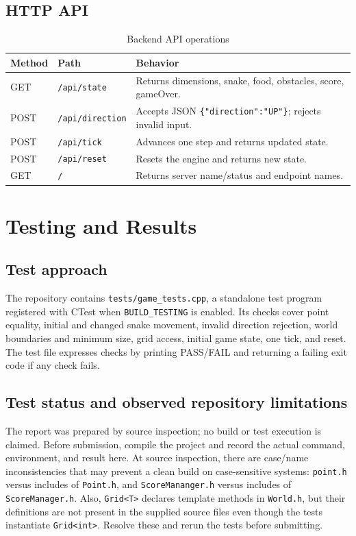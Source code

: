 \documentclass[12pt,a4paper]{report}
\begin{document}
\section{HTTP API}
\begin{table}[H]
\centering
\caption{Backend API operations}
\begin{tabular}{p{27mm}p{34mm}p{72mm}}
\toprule
Method & Path & Behavior\\\midrule
GET & \texttt{/api/state} & Returns dimensions, snake, food, obstacles, score, gameOver.\\
POST & \texttt{/api/direction} & Accepts JSON \texttt{\{"direction":"UP"\}}; rejects invalid input.\\
POST & \texttt{/api/tick} & Advances one step and returns updated state.\\
POST & \texttt{/api/reset} & Resets the engine and returns new state.\\
GET & \texttt{/} & Returns server name/status and endpoint names.\\
\bottomrule
\end{tabular}
\end{table}

\chapter{Testing and Results}
\section{Test approach}
The repository contains \texttt{tests/game\_tests.cpp}, a standalone test
program registered with CTest when \texttt{BUILD\_TESTING} is enabled. Its
checks cover point equality, initial and changed snake movement, invalid
direction rejection, world boundaries and minimum size, grid access, initial
game state, one tick, and reset. The test file expresses checks by printing
PASS/FAIL and returning a failing exit code if any check fails.

\section{Test status and observed repository limitations}
The report was prepared by source inspection; no build or test execution is
claimed. Before submission, compile the project and record the actual command,
environment, and result here. At source inspection, there are case/name
inconsistencies that may prevent a clean build on case-sensitive systems:
\texttt{point.h} versus includes of \texttt{Point.h}, and
\texttt{ScoreMananger.h} versus includes of \texttt{ScoreManager.h}. Also,
\texttt{Grid<T>} declares template methods in \texttt{World.h}, but their
definitions are not present in the supplied source files even though the tests
instantiate \texttt{Grid<int>}. Resolve these and rerun the tests before
submitting.
\end{document}
